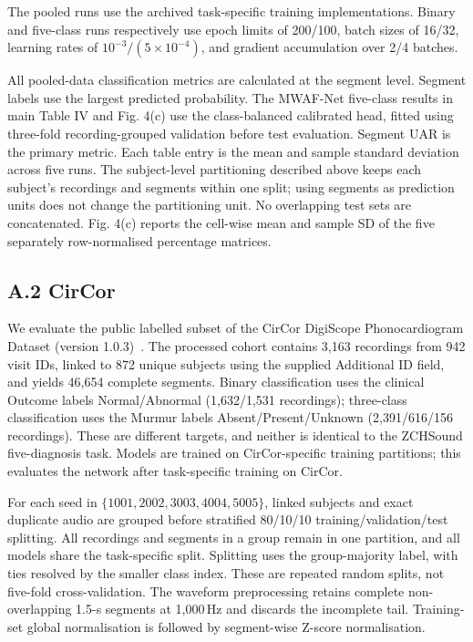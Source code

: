 The pooled runs use the archived task-specific training implementations. Binary and five-class runs respectively use epoch limits of 200/100, batch sizes of 16/32, learning rates of $10^{-3}/(5\times10^{-4})$, and gradient accumulation over 2/4 batches.

All pooled-data classification metrics are calculated at the segment level. Segment labels use the largest predicted probability. The MWAF-Net five-class results in main Table IV and Fig. 4(c) use the class-balanced calibrated head, fitted using three-fold recording-grouped validation before test evaluation. Segment UAR is the primary metric. Each table entry is the mean and sample standard deviation across five runs. The subject-level partitioning described above keeps each subject's recordings and segments within one split; using segments as prediction units does not change the partitioning unit. No overlapping test sets are concatenated. Fig. 4(c) reports the cell-wise mean and sample SD of the five separately row-normalised percentage matrices.

\subsection*{A.2 CirCor}
We evaluate the public labelled subset of the CirCor DigiScope Phonocardiogram Dataset (version 1.0.3)~\cite{CirCorDataset}. The processed cohort contains 3,163 recordings from 942 visit IDs, linked to 872 unique subjects using the supplied Additional ID field, and yields 46,654 complete segments. Binary classification uses the clinical Outcome labels Normal/Abnormal (1,632/1,531 recordings); three-class classification uses the Murmur labels Absent/Present/Unknown (2,391/616/156 recordings). These are different targets, and neither is identical to the ZCHSound five-diagnosis task. Models are trained on CirCor-specific training partitions; this evaluates the network after task-specific training on CirCor.

For each seed in $\{1001,2002,3003,4004,5005\}$, linked subjects and exact duplicate audio are grouped before stratified 80/10/10 training/validation/test splitting. All recordings and segments in a group remain in one partition, and all models share the task-specific split. Splitting uses the group-majority label, with ties resolved by the smaller class index. These are repeated random splits, not five-fold cross-validation. The waveform preprocessing retains complete non-overlapping 1.5-s segments at 1,000\,Hz and discards the incomplete tail. Training-set global normalisation is followed by segment-wise Z-score normalisation.

